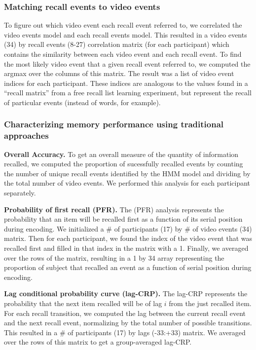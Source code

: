 \documentclass{article}
\begin{document}
{\subsubsection{Matching recall events to video events}
To figure out which video event each recall event referred to, we correlated the video events model and each recall events model. This resulted in a video events (34) by recall events (8-27) correlation matrix (for each participant) which contains the similarity between each video event and each recall event.  To find the most likely video event that a given recall event referred to, we computed the argmax over the columns of this matrix.  The result was a list of video event indices for each participant. These indices are analogous to the values found in a ``recall matrix'' from a free recall list learning experiment, but represent the recall of particular events (instead of words, for example).
%
\subsubsection{Characterizing memory performance using traditional approaches}

\textbf{Overall Accuracy.}  To get an overall measure of the quantity of information recalled, we computed the proportion of sucessfully recalled events by counting the number of unique recall events identified by the HMM model and dividing by the total number of video events.  We performed this analysis for each participant separately.

\textbf{Probability of first recall (PFR).}  The (PFR) analysis represents the probability that an item will be recalled first as a function of its serial position during encoding. We initialized a \# of participants (17) by \# of video events (34) matrix. Then for each participant, we found the index of the video event that was recalled first and filled in that index in the matrix with a 1.  Finally, we averaged over the rows of the matrix, resulting in a 1 by 34 array representing the proportion of subject that recalled an event as a function of serial position during encoding.

\textbf{Lag conditional probability curve (lag-CRP).} The lag-CRP represents the probability that the next item recalled will be of lag $i$ from the just recalled item. For each recall transition, we computed the lag between the current recall event and the next recall event, normalizing by the total number of possible transitions.  This resulted in a \# of participants (17) by lags (-33:+33) matrix. We averaged over the rows of this matrix to get a group-averaged lag-CRP.

}
\end{document}
